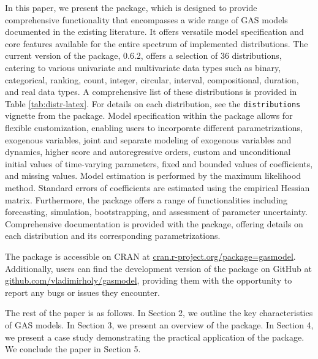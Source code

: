 In this paper, we present the  package, which is designed to provide comprehensive functionality that encompasses a wide range of GAS models documented in the existing literature. It offers versatile model specification and core features available for the entire spectrum of implemented distributions. The current version of the  package, 0.6.2, offers a selection of 36 distributions, catering to various univariate and multivariate data types such as binary, categorical, ranking, count, integer, circular, interval, compositional, duration, and real data types. A comprehensive list of these distributions is provided in Table \ref{tab:distr-latex}. For details on each distribution, see the \texttt{distributions} vignette from the  package. Model specification within the package allows for flexible customization, enabling users to incorporate different parametrizations, exogenous variables, joint and separate modeling of exogenous variables and dynamics, higher score and autoregressive orders, custom and unconditional initial values of time-varying parameters, fixed and bounded values of coefficients, and missing values. Model estimation is performed by the maximum likelihood method. Standard errors of coefficients are estimated using the empirical Hessian matrix. Furthermore, the package offers a range of functionalities including forecasting, simulation, bootstrapping, and assessment of parameter uncertainty. Comprehensive documentation is provided with the package, offering details on each distribution and its corresponding parametrizations.

The  package is accessible on CRAN at \url{cran.r-project.org/package=gasmodel}. Additionally, users can find the development version of the package on GitHub at \url{github.com/vladimirholy/gasmodel}, providing them with the opportunity to report any bugs or issues they encounter.

The rest of the paper is as follows. In Section 2, we outline the key characteristics of GAS models. In Section 3, we present an overview of the  package. In Section 4, we present a case study demonstrating the practical application of the package. We conclude the paper in Section 5.

